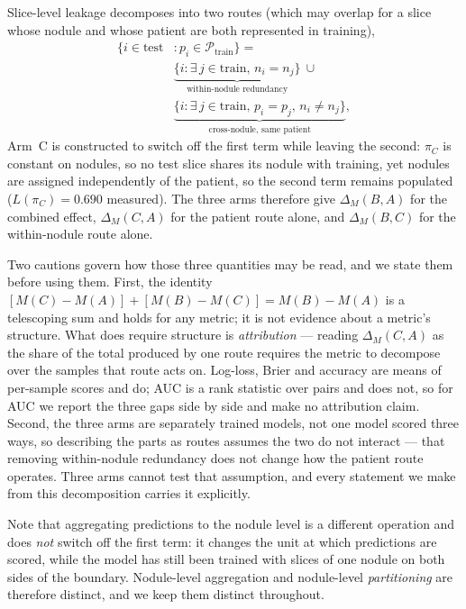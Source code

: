 \documentclass{ieeeaccess}
\begin{document}
Slice-level leakage decomposes into two routes (which may overlap for a slice whose nodule and
whose patient are both represented in training),
\begin{equation}
\begin{aligned}
\{i\in\mathrm{test}&:p_i\in\mathcal{P}_{\mathrm{train}}\}=\\[2pt]
&\underbrace{\{i:\exists\,j\in\mathrm{train},\,n_i=n_j\}}_{\text{within-nodule redundancy}}\ \cup\\[2pt]
&\underbrace{\{i:\exists\,j\in\mathrm{train},\,p_i=p_j,\,n_i\neq n_j\}}_{\text{cross-nodule, same patient}},
\end{aligned}
\end{equation}
Arm~C is constructed to switch off the first term while leaving the second: $\pi_C$ is constant on
nodules, so no test slice shares its nodule with training, yet nodules are assigned independently of
the patient, so the second term remains populated ($L(\pi_C)=0.690$ measured). The three arms
therefore give $\Delta_M(B,A)$ for the combined effect, $\Delta_M(C,A)$ for the patient route alone,
and $\Delta_M(B,C)$ for the within-nodule route alone.

Two cautions govern how those three quantities may be read, and we state them before using them.
First, the identity $[M(C)-M(A)]+[M(B)-M(C)]=M(B)-M(A)$ is a telescoping sum and holds for any
metric; it is not evidence about a metric's structure. What does require structure is
\emph{attribution} --- reading $\Delta_M(C,A)$ as the share of the total produced by one route
requires the metric to decompose over the samples that route acts on. Log-loss, Brier and accuracy
are means of per-sample scores and do; AUC is a rank statistic over pairs and does not, so for AUC we
report the three gaps side by side and make no attribution claim. Second, the three arms are
separately trained models, not one model scored three ways, so describing the parts as routes assumes
the two do not interact --- that removing within-nodule redundancy does not change how the patient
route operates. Three arms cannot test that assumption, and every statement we make from this
decomposition carries it explicitly.

Note that aggregating predictions to the nodule level is a different operation and does \emph{not}
switch off the first term: it changes the unit at which predictions are scored, while the model has
still been trained with slices of one nodule on both sides of the boundary. Nodule-level aggregation
and nodule-level \emph{partitioning} are therefore distinct, and we keep them distinct throughout.
\end{document}
